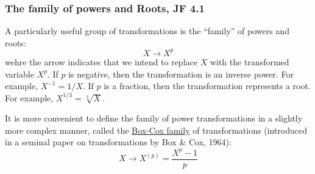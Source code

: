 
\subsubsection*{The family of powers and Roots, JF 4.1}
A particularly useful group of transformations is the ``family'' of powers and roots:
$$
X \to X^p
$$
wehre the arrow indicates that we intend to replace $X$ with the transformed variable $X^p$.
If $p$ is negative, then the transformation is an inverse power. For example, $X^{-1} = 1/X$.
If $p$ is a fraction, then the transformation represents a root.  For example, $X^{1/3} = \sqrt[3]{X}$.

It is more convenient to define the family of power transformations in a slightly more complex manner, called the \underline{Box-Cox family} of transformations (introduced in a seminal paper on transformations by Box \& Cox, 1964):
$$
X \to X^{(p)} = \frac{X^p - 1}{p}
$$

